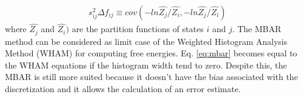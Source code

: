 \begin{equation}
\label{eq:varmbar}
\begin{aligned}
s_{ij}^{2} \Delta f_{ij} \equiv cov (-ln \hat{Z_{j}}/\hat{Z_{i}},-ln \hat{Z_{j}}/\hat{Z_{i}})
\end{aligned}
\end{equation}
where $\hat{Z_{j}}$ and $\hat{Z_{i}})$ are the partition functions of states $i$ and $j$. The MBAR method can be considered as limit case of the 
Weighted Histogram Analysis Method (WHAM) \cite{wham} for computing free energies. Eq. \eqref{eq:mbar} becomes equal to the WHAM equations if the histogram width tend to zero. Despite this, the MBAR is still more suited because it doesn't have the bias associated with the discretization  and it allows the calculation of an error estimate.





